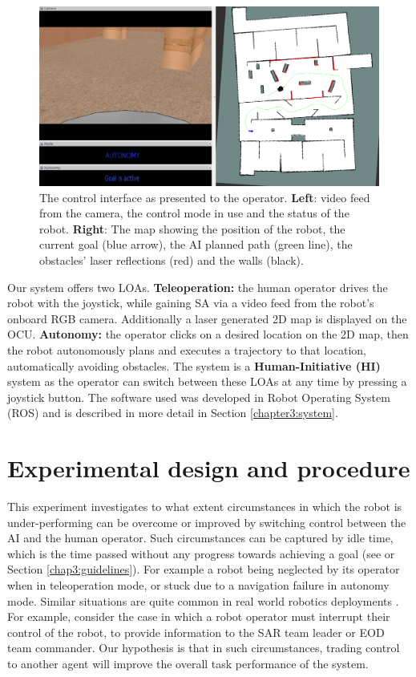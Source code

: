 \documentclass[a4paper,12pt,oneside,openright]{bhamthesis}
\begin{document}
\begin{figure}
	\centering
	\includegraphics[width=0.8\columnwidth]{chapter4_fig/interface.png}
	\caption{The control interface as presented to the operator. \textbf{Left}: video feed from the camera, the control mode in use and the status of the robot. \textbf{Right}: The map showing the position of the robot, the current goal (blue arrow), the AI planned path (green line), the obstacles' laser reflections (red) and the walls (black).} 
	\label{fig:interface_exp2}
\end{figure}

Our system offers two LOAs. \textbf{Teleoperation:} the human operator drives the robot with the joystick, while gaining SA via a video feed from the robot's onboard RGB camera. Additionally a laser generated 2D map is displayed on the OCU. \textbf{Autonomy:} the operator clicks on a desired location on the 2D map, then the robot autonomously plans and executes a trajectory to that location, automatically avoiding obstacles. The system is a \textbf{Human-Initiative (HI)} system as the operator can switch between these LOAs at any time by pressing a joystick button. The software used was developed in Robot Operating System (ROS) and is described in more detail in Section \ref{chapter3:system}.

\section{Experimental design and procedure}

This experiment investigates to what extent circumstances in which the robot is under-performing can be overcome or improved by switching control between the AI and the human operator. Such circumstances can be captured by idle time, which is the time passed without any progress towards achieving a goal (see \cite{Chiou2015} or Section \ref{chap3:guidelines}). For example a robot being neglected by its operator when in teleoperation mode, or stuck due to a navigation failure in autonomy mode. Similar situations are quite common in real world robotics deployments \cite{Murphy2004}. For example, consider the case in which a robot operator must interrupt their control of the robot, to provide information to the SAR team leader or EOD team commander. Our hypothesis is that in such circumstances, trading control to another agent will improve the overall task performance of the system. 
\end{document}
